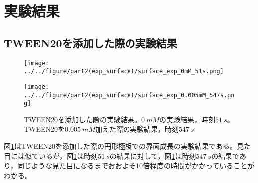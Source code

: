\documentclass[autodetect-engine,dvi=dvipdfmx,a4paper,ja=standard,oneside,openany,11pt,draft]{bxjsbook}
\begin{document}
\section{実験結果}
\subsection{TWEEN20を添加した際の実験結果}
\begin{figure}[htbp]
  \begin{minipage}
    {0.5\textwidth}
    \subcaption{}
    \centering
    \texttt{[image: ../../figure/part2(exp\_surface)/surface\_exp\_0mM\_51s.png]}
    \label{fig:surface_exp_0mM_51s}
  \end{minipage}
  \begin{minipage}
    {0.5\textwidth}
    \subcaption{}
    \centering
    \texttt{[image: ../../figure/part2(exp\_surface)/surface\_exp\_0.005mM\_547s.png]}
    \label{fig:surface_exp_0.005mM_547s}
  \end{minipage}
  \caption{TWEEN20を添加した際の実験結果。$\SI{0}{mM}$の実験結果，時刻$\SI{51}{s}$。TWEEN20を$\SI{0.005}{mM}$加えた際の実験結果，時刻$\SI{547}{s}$}
  \label{fig:surface_exp}
\end{figure}
図\ref{fig:surface_exp}はTWEEN20を添加した際の円形極板での界面成長の実験結果である。見た目には似ているが，図\ref{fig:surface_exp}は時刻$\SI{51}{s}$の結果に対して，図\ref{fig:surface_exp}は時刻$\SI{547}{s}$の結果であり，同じような見た目になるまでおおよそ10倍程度の時間がかかっていることがわかる。
\end{document}
